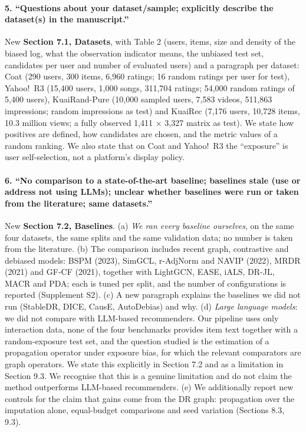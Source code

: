 \documentclass[11pt]{article}
\begin{document}
\paragraph{5. ``Questions about your dataset/sample; explicitly describe the dataset(s) in the manuscript.''}
New \textbf{Section 7.1, Datasets}, with Table 2 (users, items, size and density of the biased log,
what the observation indicator means, the unbiased test set, candidates per user and number of
evaluated users) and a paragraph per dataset: Coat (290 users, 300 items, 6{,}960 ratings; 16 random
ratings per user for test), Yahoo!\ R3 (15{,}400 users, 1{,}000 songs, 311{,}704 ratings; 54{,}000
random ratings of 5{,}400 users), KuaiRand-Pure (10{,}000 sampled users, 7{,}583 videos, 511{,}863
impressions; random impressions as test) and KuaiRec (7{,}176 users, 10{,}728 items, 10.3 million views;
a fully observed 1{,}411 $\times$ 3{,}327 matrix as test). We state how positives are defined, how
candidates are chosen, and the metric values of a random ranking. We also state that on Coat and
Yahoo!\ R3 the ``exposure'' is user self-selection, not a platform's display policy.

\paragraph{6. ``No comparison to a state-of-the-art baseline; baselines stale (use or address not using LLMs); unclear whether baselines were run or taken from the literature; same datasets.''}
New \textbf{Section 7.2, Baselines}. (a) \emph{We ran every baseline ourselves}, on the same four
datasets, the same splits and the same validation data; no number is taken from the literature. (b)
The comparison includes recent graph, contrastive and debiased models: BSPM (2023), SimGCL, r-AdjNorm
and NAVIP (2022), MRDR (2021) and GF-CF (2021), together with LightGCN, EASE, iALS, DR-JL, MACR and PDA;
each is tuned per split, and the number of configurations is reported (Supplement S2). (c) A new
paragraph explains the baselines we did not run (StableDR, DICE, CausE, AutoDebias) and why. (d)
\emph{Large language models}: we did not compare with LLM-based recommenders. Our pipeline uses only
interaction data, none of the four benchmarks provides item text together with a random-exposure test
set, and the question studied is the estimation of a propagation operator under exposure bias, for which
the relevant comparators are graph operators. We state this explicitly in Section 7.2 and as a limitation
in Section 9.3. We recognise that this is a genuine limitation and do not claim the method outperforms
LLM-based recommenders. (e) We additionally report new controls for the claim that gains come from the DR
graph: propagation over the imputation alone, equal-budget comparisons and seed variation (Sections 8.3, 9.3).
\end{document}
